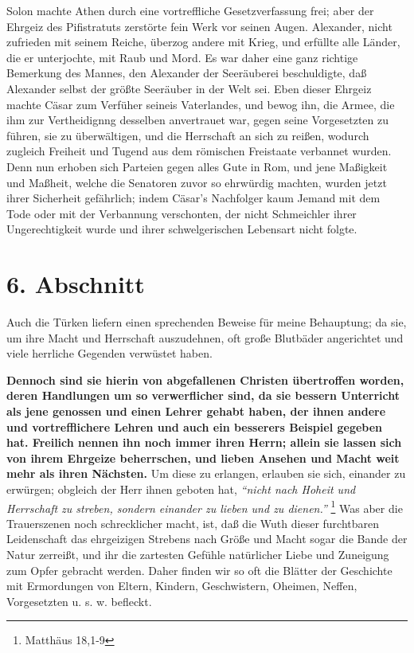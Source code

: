Solon machte Athen durch eine vortreffliche Gesetzverfassung frei; aber der
Ehrgeiz des Pifistratuts zerstörte fein Werk vor seinen Augen. Alexander, nicht
zufrieden mit seinem Reiche, überzog andere mit Krieg, und erfüllte alle Länder,
die er unterjochte, mit Raub und Mord. Es war daher eine ganz richtige Bemerkung
des Mannes, den Alexander der Seeräuberei beschuldigte, daß Alexander selbst
der größte Seeräuber in der Welt sei. Eben dieser Ehrgeiz machte Cäsar zum
Verfüher seineis Vaterlandes, und bewog ihn, die Armee, die ihm zur
Vertheidignng desselben anvertrauet war, gegen seine Vorgesetzten zu führen, sie
zu überwältigen, und die Herrschaft an sich zu reißen, wodurch zugleich Freiheit
und Tugend aus dem römischen Freistaate verbannet wurden. Denn nun erhoben sich
Parteien gegen alles Gute in Rom, und jene Maßigkeit und Maßheit, welche die
Senatoren zuvor so ehrwürdig machten, wurden jetzt ihrer Sicherheit gefährlich;
indem Cäsar’s Nachfolger kaum Jemand mit dem Tode oder mit der Verbannung
verschonten, der nicht Schmeichler ihrer Ungerechtigkeit wurde und ihrer
schwelgerischen Lebensart nicht folgte.

\section{6. Abschnitt} \label{kap8_ab6}

Auch die Türken liefern einen sprechenden Beweise für meine Behauptung; da sie,
um ihre Macht und Herrschaft auszudehnen, oft große Blutbäder angerichtet und
viele herrliche Gegenden verwüstet haben.

\medskip

\textbf{Dennoch sind sie hierin von abgefallenen Christen übertroffen worden, deren
Handlungen um so verwerflicher sind, da sie bessern Unterricht als jene genossen
und einen Lehrer gehabt haben, der ihnen andere und vortrefflichere Lehren und
auch ein besserers Beispiel gegeben hat. Freilich nennen ihn noch immer ihren
Herrn; allein sie lassen sich von ihrem Ehrgeize beherrschen, und lieben Ansehen
und Macht weit mehr als ihren Nächsten.} Um diese zu erlangen, erlauben sie sich,
einander zu erwürgen;  obgleich der Herr ihnen geboten hat,
\textit{"`nicht nach Hoheit
und Herrschaft zu streben, sondern einander zu lieben und zu
dienen."'}
\footnote{Matthäus 18,1-9}
Was aber die Trauerszenen noch schrecklicher
macht, ist, daß die Wuth dieser furchtbaren Leidenschaft das ehrgeizigen
Strebens nach Größe und Macht sogar die Bande der Natur zerreißt, und ihr die
zartesten Gefühle natürlicher Liebe und Zuneigung zum Opfer gebracht werden.
Daher finden wir so oft die Blätter der Geschichte mit Ermordungen von Eltern,
Kindern, Geschwistern, Oheimen, Neffen, Vorgesetzten u. s. w. befleckt.

